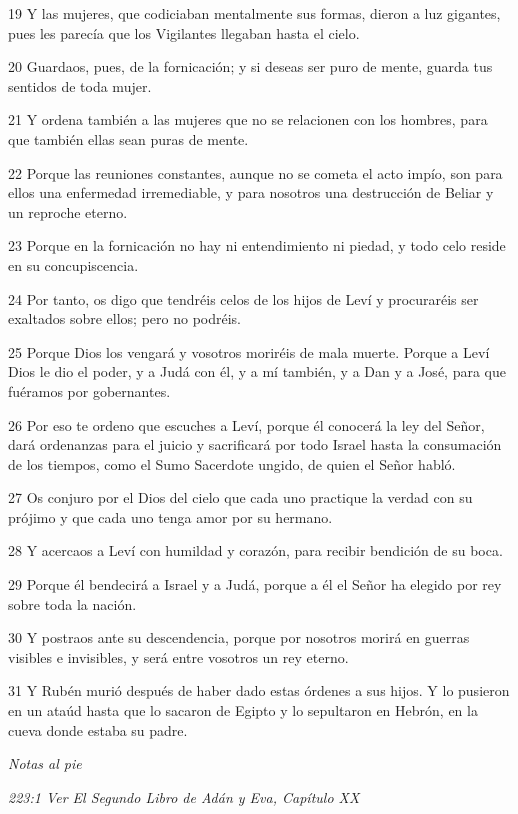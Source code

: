 \par 19 Y las mujeres, que codiciaban mentalmente sus formas, dieron a luz gigantes, pues les parecía que los Vigilantes llegaban hasta el cielo.

\par 20 Guardaos, pues, de la fornicación; y si deseas ser puro de mente, guarda tus sentidos de toda mujer.

\par 21 Y ordena también a las mujeres que no se relacionen con los hombres, para que también ellas sean puras de mente.

\par 22 Porque las reuniones constantes, aunque no se cometa el acto impío, son para ellos una enfermedad irremediable, y para nosotros una destrucción de Beliar y un reproche eterno.

\par 23 Porque en la fornicación no hay ni entendimiento ni piedad, y todo celo reside en su concupiscencia.

\par 24 Por tanto, os digo que tendréis celos de los hijos de Leví y procuraréis ser exaltados sobre ellos; pero no podréis.

\par 25 Porque Dios los vengará y vosotros moriréis de mala muerte. Porque a Leví Dios le dio el poder, y a Judá con él, y a mí también, y a Dan y a José, para que fuéramos por gobernantes.

\par 26 Por eso te ordeno que escuches a Leví, porque él conocerá la ley del Señor, dará ordenanzas para el juicio y sacrificará por todo Israel hasta la consumación de los tiempos, como el Sumo Sacerdote ungido, de quien el Señor habló.

\par 27 Os conjuro por el Dios del cielo que cada uno practique la verdad con su prójimo y que cada uno tenga amor por su hermano.

\par 28 Y acercaos a Leví con humildad y corazón, para recibir bendición de su boca.

\par 29 Porque él bendecirá a Israel y a Judá, porque a él el Señor ha elegido por rey sobre toda la nación.

\par 30 Y postraos ante su descendencia, porque por nosotros morirá en guerras visibles e invisibles, y será entre vosotros un rey eterno.

\par 31 Y Rubén murió después de haber dado estas órdenes a sus hijos. Y lo pusieron en un ataúd hasta que lo sacaron de Egipto y lo sepultaron en Hebrón, en la cueva donde estaba su padre.

\par \textit{Notas al pie}

\par \textit{223:1 Ver El Segundo Libro de Adán y Eva, Capítulo XX}


